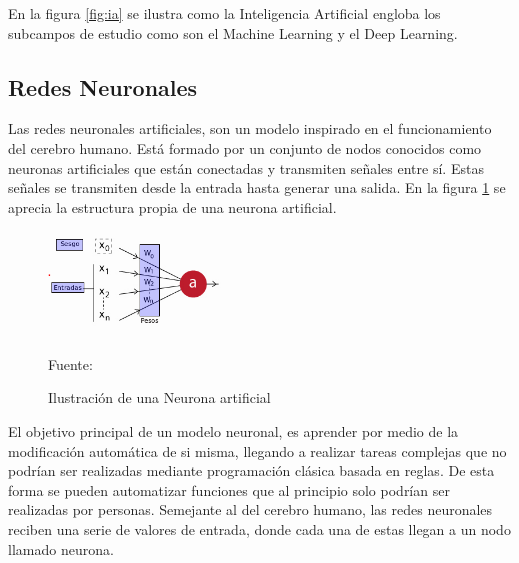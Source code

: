 
En la figura \ref{fig:ia} se ilustra como la Inteligencia Artificial engloba los subcampos de estudio como son el Machine Learning y el Deep Learning.\\

\subsection{Redes Neuronales}
Las redes neuronales artificiales, son un modelo inspirado en el funcionamiento del cerebro humano. Está formado por un conjunto de nodos conocidos como neuronas artificiales que están conectadas y transmiten señales entre sí. Estas señales se transmiten desde la entrada hasta generar una salida. En la figura \ref{fig:classical_ml} se aprecia la estructura propia de una neurona artificial.\\

\begin{figure}[H]
    \begin{center}
        \includegraphics[width=5cm]{img/capitulo_2/neurona.png}
        \caption{Ilustración de una Neurona artificial\\}
        Fuente: \cite{tensorflow_neurona}
    \label{fig:classical_ml}
    \end{center}
\end{figure}

El objetivo principal de un modelo neuronal, es aprender por medio de la modificación automática de si misma, llegando a realizar tareas complejas que no podrían ser realizadas mediante programación clásica basada en reglas. De esta forma se pueden automatizar funciones que al principio solo podrían ser realizadas por personas. Semejante al del cerebro humano, las redes neuronales reciben una serie de valores de entrada, donde cada una de estas llegan a un nodo llamado neurona.\\

